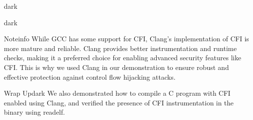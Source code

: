 \begin{baseBoxThree}{}{dark}
    \begin{baseBoxThree}{}{dark}
    \end{baseBoxThree}
    \smallskip
    \begin{baseBoxThree}{Note}{info}
        \smallskip
        While GCC has some support for CFI, Clang's implementation of CFI is more mature and reliable.
        Clang provides better instrumentation and runtime checks, making it a preferred choice for enabling advanced security features like CFI.
        This is why we used Clang in our demonstration to ensure robust and effective protection against control flow hijacking attacks.
        \smallskip
    \end{baseBoxThree}
    \smallskip
    \begin{baseBoxThree}{Wrap Up}{dark}
        \smallskip
        We also demonstrated how to compile a C program with CFI enabled using Clang, and verified the presence of CFI instrumentation in the binary using readelf.
        \smallskip
    \end{baseBoxThree}
    \smallskip
\end{baseBoxThree}

